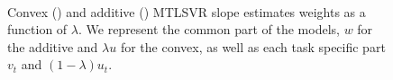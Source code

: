 \begin{figure}
    \centering
    \quad%
    \\
    \caption{{Convex} (\protect{}) and {additive} (\protect{}) MTLSVR slope estimates weights as a function of $\lambda$. We represent the common part of the models, $w$ for the {additive} and $\lambda u$ for the {convex}, as well as each task specific part $v_t$ and $(1 - \lambda) u_t$.}
    \label{fig:synthetic_specWeights}
\end{figure}




